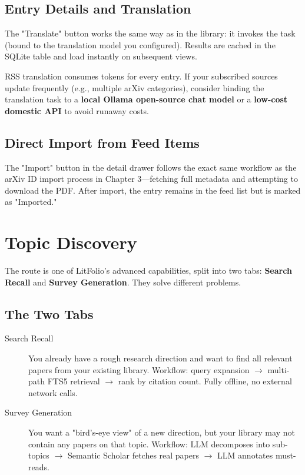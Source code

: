 \section{Entry Details and Translation}


The "Translate" button works the same way as in the library: it invokes the  task
(bound to the translation model you configured). Results are cached in the SQLite 
table and load instantly on subsequent views.

\begin{warnbox}
RSS translation consumes tokens for every entry. If your subscribed sources update frequently
(e.g., multiple arXiv categories), consider binding the translation task to a \textbf{local Ollama
open-source chat model} or a \textbf{low-cost domestic API} to avoid runaway costs.
\end{warnbox}

\section{Direct Import from Feed Items}

The "Import" button in the detail drawer follows the exact same workflow as the arXiv ID import
process in Chapter 3---fetching full metadata and attempting to download the PDF. After import, the
entry remains in the feed list but is marked as "Imported."

\chapter{Topic Discovery}
\label{ch:topic}

The  route is one of LitFolio's advanced capabilities, split into two tabs:
\textbf{Search Recall} and \textbf{Survey Generation}. They solve different problems.

\section{The Two Tabs}

\begin{description}
  \item[Search Recall] You already have a rough research direction and want to find all relevant
    papers from your existing library. Workflow: query expansion $\to$ multi-path FTS5 retrieval
    $\to$ rank by citation count. Fully offline, no external network calls.
  \item[Survey Generation] You want a "bird's-eye view" of a new direction, but your library may
    not contain any papers on that topic. Workflow: LLM decomposes into sub-topics $\to$ Semantic
    Scholar fetches real papers $\to$ LLM annotates must-reads.
\end{description}

